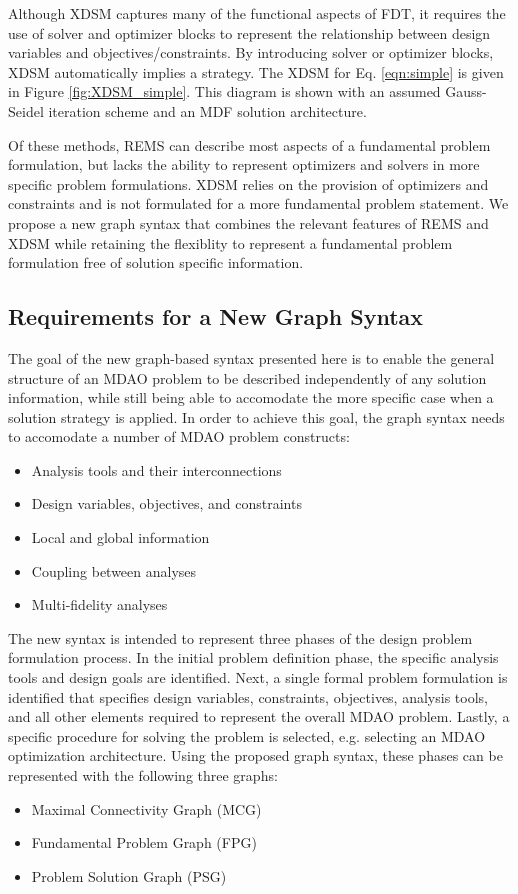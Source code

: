     Although XDSM captures many of the functional aspects of FDT, it 
    requires the use of solver and optimizer blocks to represent 
    the relationship between design variables and objectives/constraints. 
    By introducing solver or optimizer blocks, XDSM automatically implies a strategy. 
The XDSM for Eq. \ref{eqn:simple} is 
    given in Figure \ref{fig:XDSM_simple}. This diagram is shown with an 
    assumed Gauss-Seidel iteration scheme and an MDF solution architecture. 

    Of these methods, REMS can describe most aspects of a fundamental 
    problem formulation, but lacks the ability to represent optimizers and 
    solvers in more specific problem formulations. XDSM relies on the provision of  
    optimizers and constraints and is not formulated  
    for a more fundamental problem statement. We propose a new graph syntax that 
    combines the relevant features of REMS and XDSM while retaining the flexiblity to 
    represent a fundamental problem formulation free of solution specific information. 

\subsection{Requirements for a New Graph Syntax}
  \label{s:requirements}
  The goal of the new graph-based syntax presented here is to enable the general structure of an MDAO problem to be described independently of any solution information, 
  while still being able to accomodate the more specific case when a solution 
  strategy is applied. In order to achieve this goal, 
  the graph syntax needs to accomodate a number of MDAO problem constructs: 
  \begin{itemize}
    \item Analysis tools and their interconnections
    \item Design variables, objectives, and constraints
    \item Local and global information
    \item Coupling between analyses
    \item Multi-fidelity analyses
  \end{itemize}

  The new syntax is intended to represent three phases of the design problem 
  formulation process. In the initial problem definition phase, the specific 
  analysis tools and design goals are identified. Next, a single formal problem 
  formulation is identified that specifies design variables, constraints, 
  objectives, analysis tools, and all other elements required to represent 
  the overall MDAO problem. Lastly, a specific procedure for solving the problem 
  is selected, e.g. selecting an MDAO optimization architecture. Using 
  the proposed graph syntax, these phases can be represented with the following 
  three graphs:
  \begin{itemize}
    \item Maximal Connectivity Graph (MCG)
    \item Fundamental Problem Graph (FPG)
    \item Problem Solution Graph (PSG)
  \end{itemize}

